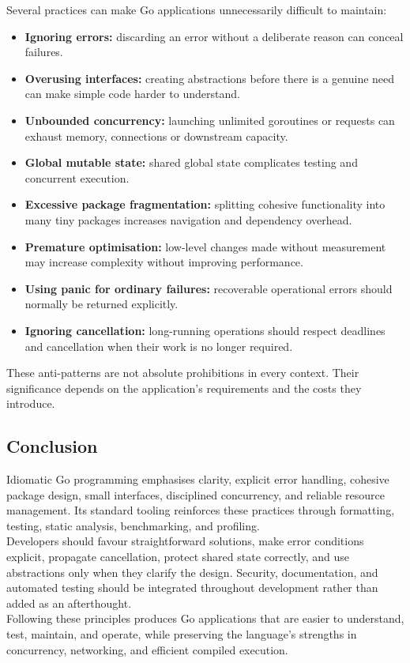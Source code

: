 Several practices can make Go applications unnecessarily difficult to maintain:

\begin{itemize}
    \item \textbf{Ignoring errors:} discarding an error without a deliberate reason can conceal failures.
    \item \textbf{Overusing interfaces:} creating abstractions before there is a genuine need can make simple code harder to understand.
    \item \textbf{Unbounded concurrency:} launching unlimited goroutines or requests can exhaust memory, connections or downstream capacity.
    \item \textbf{Global mutable state:} shared global state complicates testing and concurrent execution.
    \item \textbf{Excessive package fragmentation:} splitting cohesive functionality into many tiny packages increases navigation and dependency overhead.
    \item \textbf{Premature optimisation:} low-level changes made without measurement may increase complexity without improving performance.
    \item \textbf{Using panic for ordinary failures:} recoverable operational errors should normally be returned explicitly.
    \item \textbf{Ignoring cancellation:} long-running operations should respect deadlines and cancellation when their work is no longer required.
\end{itemize}

These anti-patterns are not absolute prohibitions in every context. Their significance depends on the application's requirements and the costs they introduce.

\subsection{Conclusion}

Idiomatic Go programming emphasises clarity, explicit error handling, cohesive package design, small interfaces, disciplined concurrency, and reliable resource management. Its standard tooling reinforces these practices through formatting, testing, static analysis, benchmarking, and profiling.\\

Developers should favour straightforward solutions, make error conditions explicit, propagate cancellation, protect shared state correctly, and use abstractions only when they clarify the design. Security, documentation, and automated testing should be integrated throughout development rather than added as an afterthought.\\

Following these principles produces Go applications that are easier to understand, test, maintain, and operate, while preserving the language's strengths in concurrency, networking, and efficient compiled execution.\\

